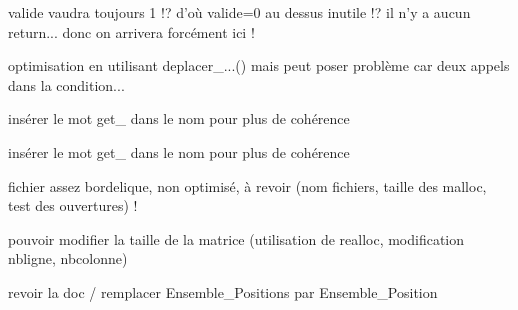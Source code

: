 
\begin{DoxyRefList}
\item[\label{todo__todo000007}%
\hypertarget{todo__todo000007}{}%
\-Membre \hyperlink{plateau_8c_a233209249792b1a2c99163fc53ce62aa}{capture\-Chaines} (\-Plateau plateau, \hyperlink{structPion}{\-Pion} pion, int $\ast$valide)]valide vaudra toujours 1 !? d'où valide=0 au dessus inutile !? il n'y a aucun return... donc on arrivera forcément ici !  
\item[\label{todo__todo000005}%
\hypertarget{todo__todo000005}{}%
\-Membre \hyperlink{libertes_8c_ad3022110d9d089ca0e9672f8aa89bbf1}{determine\-Liberte} (\-Plateau plateau, \-Chaine chaine)]optimisation en utilisant deplacer\-\_\-...() mais peut poser problème car deux appels dans la condition...  
\item[\label{todo__todo000003}%
\hypertarget{todo__todo000003}{}%
\-Membre \hyperlink{ensemble_8c_aa9174d08bc657e15cfe1ebf843421731}{ensemble\-\_\-courant} (\hyperlink{structEnsemble}{\-Ensemble} \-E)]insérer le mot get\-\_\- dans le nom pour plus de cohérence  
\item[\label{todo__todo000002}%
\hypertarget{todo__todo000002}{}%
\-Membre \hyperlink{ensemble_8c_a81d2fb89bbbb2b90cacabfa9d6398849}{ensemble\-\_\-tete} (\hyperlink{structEnsemble}{\-Ensemble} \-E)]insérer le mot get\-\_\- dans le nom pour plus de cohérence  
\item[\label{todo__todo000004}%
\hypertarget{todo__todo000004}{}%
\-Fichier \hyperlink{go_8c}{go.c} ]fichier assez bordelique, non optimisé, à revoir (nom fichiers, taille des malloc, test des ouvertures) !  
\item[\label{todo__todo000001}%
\hypertarget{todo__todo000001}{}%
\-Fichier \hyperlink{matrice_8h}{matrice.h} ]pouvoir modifier la taille de la matrice (utilisation de realloc, modification nbligne, nbcolonne)  
\item[\label{todo__todo000006}%
\hypertarget{todo__todo000006}{}%
\-Fichier \hyperlink{pion_8c}{pion.c} ]revoir la doc / remplacer \-Ensemble\-\_\-\-Positions par \-Ensemble\-\_\-\-Position 
\end{DoxyRefList}